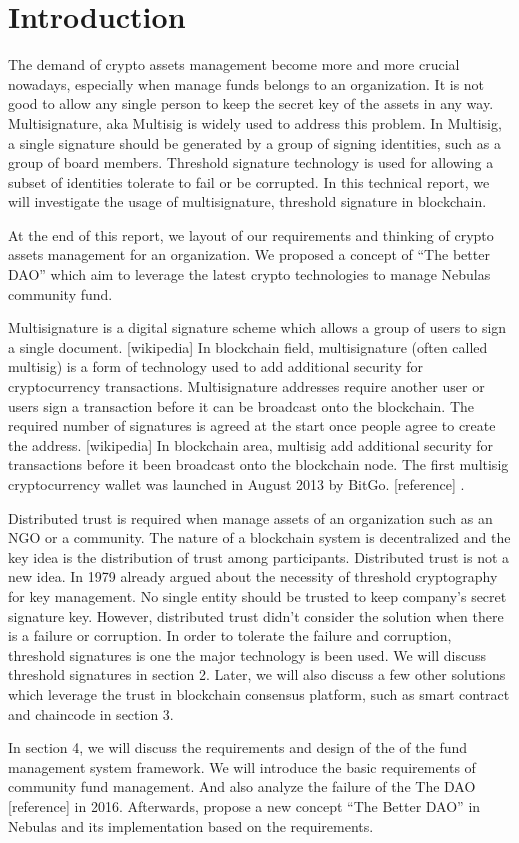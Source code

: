 \section{Introduction}

The demand of crypto assets management become more and more crucial nowadays, especially when manage funds belongs to an organization. It is not good to allow any single person to keep the secret key of the assets in any way. Multisignature, aka Multisig is widely used to address this problem. In Multisig, a single signature should be generated by a group of signing identities, such as a group of board members. Threshold signature technology is used for allowing a subset of identities tolerate to fail or be corrupted. In this technical report, we will investigate the usage of multisignature, threshold signature in blockchain. 

At the end of this report, we layout of our requirements and thinking of crypto assets management for an organization. We proposed a concept of “The better DAO” which aim to leverage the latest crypto technologies to manage Nebulas community fund.

Multisignature is a digital signature scheme which allows a group of users to sign a single document. [wikipedia] In blockchain field, multisignature (often called multisig) is a form of technology used to add additional security for cryptocurrency transactions. Multisignature addresses require another user or users sign a transaction before it can be broadcast onto the blockchain. The required number of signatures is agreed at the start once people agree to create the address. [wikipedia] In blockchain area, multisig add additional security for transactions before it been broadcast onto the blockchain node. The first multisig cryptocurrency wallet was launched in August 2013 by BitGo. [reference] .

Distributed trust is required when manage assets of an organization such as an NGO or a community. The nature of a blockchain system is decentralized and the key idea is the distribution of trust among participants. Distributed trust is not a new idea. In 1979 already argued about the necessity of threshold cryptography for key management. No single entity should be trusted to keep company's secret signature key. However, distributed trust didn’t consider the solution when there is a failure or corruption. In order to tolerate the failure and corruption, threshold signatures is one the major technology is been used. We will discuss threshold signatures in section 2. Later, we will also discuss a few other solutions which leverage the trust in blockchain consensus platform, such as smart contract and chaincode in section 3.

In section 4, we will discuss the requirements and design of the of the fund management system framework. We will introduce the basic requirements of community fund management. And also analyze the failure of the The DAO [reference] in 2016. Afterwards, propose a new concept “The Better DAO” in Nebulas and its implementation based on the requirements.
